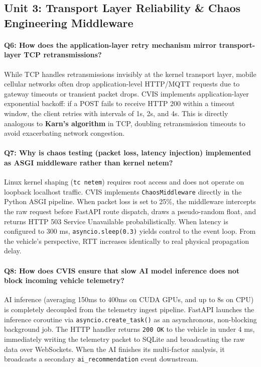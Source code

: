 \documentclass[12pt,a4paper]{report}
\begin{document}
\subsection{Unit 3: Transport Layer Reliability \& Chaos Engineering Middleware}

\paragraph{Q6: How does the application-layer retry mechanism mirror transport-layer TCP retransmissions?}
While TCP handles retransmissions invisibly at the kernel transport layer, mobile cellular networks often drop application-level HTTP/MQTT requests due to gateway timeouts or transient packet drops. CVIS implements application-layer exponential backoff: if a POST fails to receive HTTP 200 within a timeout window, the client retries with intervals of 1s, 2s, and 4s. This is directly analogous to \textbf{Karn's algorithm} in TCP, doubling retransmission timeouts to avoid exacerbating network congestion.

\paragraph{Q7: Why is chaos testing (packet loss, latency injection) implemented as ASGI middleware rather than kernel netem?}
Linux kernel shaping (\texttt{tc netem}) requires root access and does not operate on loopback localhost traffic. CVIS implements \texttt{ChaosMiddleware} directly in the Python ASGI pipeline. When packet loss is set to 25\%, the middleware intercepts the raw request before FastAPI route dispatch, draws a pseudo-random float, and returns HTTP 503 Service Unavailable probabilistically. When latency is configured to 300 ms, \texttt{asyncio.sleep(0.3)} yields control to the event loop. From the vehicle's perspective, RTT increases identically to real physical propagation delay.

\paragraph{Q8: How does CVIS ensure that slow AI model inference does not block incoming vehicle telemetry?}
AI inference (averaging 150ms to 400ms on CUDA GPUs, and up to 8s on CPU) is completely decoupled from the telemetry ingest pipeline. FastAPI launches the inference coroutine via \texttt{asyncio.create\_task()} as an asynchronous, non-blocking background job. The HTTP handler returns \texttt{200 OK} to the vehicle in under 4 ms, immediately writing the telemetry packet to SQLite and broadcasting the raw data over WebSockets. When the AI finishes its multi-factor analysis, it broadcasts a secondary \texttt{ai\_recommendation} event downstream.
\end{document}
